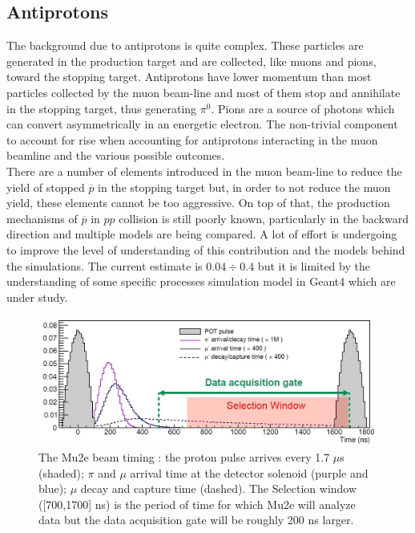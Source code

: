 \documentclass[12pt,a4paper,openright, oneside, titlepage]{book} %
\begin{document}
\subsection{Antiprotons}
\label{sec:antiprotons}
The background due to  antiprotons is quite complex. 
These particles are generated in the production target and are collected, like muons and pions, toward the stopping target. 
Antiprotons have lower momentum than most particles collected by the muon beam-line and most of them stop and annihilate in the stopping target, thus generating $\pi^0$. 
Pions are a source of photons which can convert asymmetrically in an energetic electron.
The non-trivial component to account for rise when accounting for antiprotons interacting in the muon beamline and the various possible outcomes.\\
There are a number of elements introduced in the muon beam-line to reduce the yield of stopped $\overline{p}$ in the stopping target but, in order to not reduce the muon yield, these elements cannot be too aggressive. 
On top of that, the production mechanisms of $\overline{p}$ in $pp$ collision is still poorly known, particularly in the backward direction and multiple models are being compared.
A lot of effort is undergoing to improve the level of  understanding of this contribution and the models behind the simulations. 
The current estimate is $0.04 \div 0.4$ \cite{Giovanni:2020} but it is limited by the understanding of some specific processes simulation model in Geant4 which are under study.

\begin{figure}[!htb]
\centering
\includegraphics[scale=0.7]{mu2e_event}
\caption{The Mu2e beam timing \cite{bob_mu2e}: the proton pulse arrives every 1.7 $\mu$s (shaded); 
$\pi$ and $\mu$ arrival time at the detector solenoid (purple and blue);
$\mu$ decay and capture time (dashed).
The Selection window ([700,1700] ns) is the period of time for which Mu2e will analyze data but the data acquisition gate will be roughly 200 ns larger.}
\label{_mu2e_event}
\end{figure}
\end{document}
